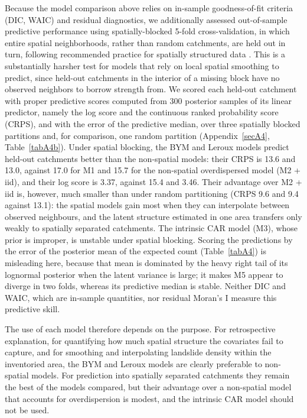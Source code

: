 \documentclass[journal abbreviation, manuscript]{copernicus}
\newcommand{\hlG}[1]{#1}
\newcommand{\hlE}[1]{#1}
\begin{document}
\hlG{Because the model comparison above relies on in-sample goodness-of-fit criteria (DIC, WAIC) and residual diagnostics, we additionally assessed out-of-sample predictive performance using spatially-blocked 5-fold cross-validation, in which entire spatial neighborhoods, rather than random catchments, are held out in turn, following recommended practice for spatially structured data }\citep{brenning2005spatial}
\hlE{. This is a substantially harsher test for models that rely on local spatial smoothing to predict, since held-out catchments in the interior of a missing block have no observed neighbors to borrow strength from. }
\hlE{We scored each held-out catchment with proper predictive scores computed from 300 posterior samples of its linear predictor, namely the log score and the continuous ranked probability score (CRPS), and with the error of the predictive median, over three spatially blocked partitions and, for comparison, one random partition (\mbox{Appendix~\ref{secA4}}, \mbox{Table~\ref{tabA4b}}). Under spatial blocking, the BYM and Leroux models predict held-out catchments better than the non-spatial models: their CRPS is 13.6 and 13.0, against 17.0 for M1 and 15.7 for the non-spatial overdispersed model (M2 + iid), and their log score is 3.37, against 15.4 and 3.46. Their advantage over M2 + iid is, however, much smaller than under random partitioning (CRPS 9.6 and 9.4 against 13.1): the spatial models gain most when they can interpolate between observed neighbours, and the latent structure estimated in one area transfers only weakly to spatially separated catchments. The intrinsic CAR model (M3), whose prior is improper, is unstable under spatial blocking. Scoring the predictions by the error of the posterior mean of the expected count (\mbox{Table~\ref{tabA4}}) is misleading here, because that mean is dominated by the heavy right tail of its lognormal posterior when the latent variance is large; it makes M5 appear to diverge in two folds, whereas its predictive median is stable. Neither DIC and WAIC, which are in-sample quantities, nor residual Moran's I measure this predictive skill.}

\hlE{The use of each model therefore depends on the purpose. For retrospective explanation, for quantifying how much spatial structure the covariates fail to capture, and for smoothing and interpolating landslide density within the inventoried area, the BYM and Leroux models are clearly preferable to non-spatial models. For prediction into spatially separated catchments they remain the best of the models compared, but their advantage over a non-spatial model that accounts for overdispersion is modest, and the intrinsic CAR model should not be used.}
\end{document}
